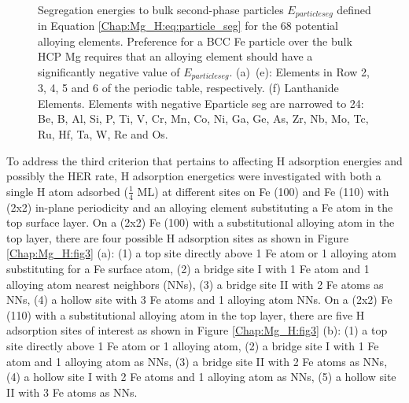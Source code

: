 \begin{figure}[!ht]
  \\
  \label{Chap:Mg_H:fig:5e}
  \label{Chap:Mg_H:fig:5f}
\caption[Segregation energies to bulk second-phase particles]{Segregation energies to bulk second-phase particles $E_{particle seg}$ defined in Equation \ref{Chap:Mg_H:eq:particle_seg} for the 68 potential alloying elements. Preference for a \ac{BCC} Fe particle over the bulk \ac{HCP} Mg requires that an alloying element should have a significantly negative value of $E_{particle seg}$. (a)~(e): Elements in Row 2, 3, 4, 5 and 6 of the periodic table, respectively. (f) Lanthanide Elements. Elements with negative Eparticle seg are narrowed to 24: Be, B, Al, Si, P, Ti, V, Cr, Mn, Co, Ni, Ga, Ge, As, Zr, Nb, Mo, Tc, Ru, Hf, Ta, W, Re and Os.}
  \label{Chap:Mg_H:fig5}
\end{figure}
\endgroup

To address the third criterion that pertains to affecting H adsorption energies and possibly the HER rate, H adsorption energetics were investigated with both a single H atom adsorbed ($\frac{1}{4}$ \ac{ML}) at different sites on Fe (100) and Fe (110) with (2x2) in-plane periodicity and an alloying element substituting a Fe atom in the top surface layer. On a (2x2) Fe (100) with a substitutional alloying atom in the top layer, there are four possible H adsorption sites as shown in Figure \ref{Chap:Mg_H:fig3} (a): (1) a top site directly above 1 Fe atom or 1 alloying atom substituting for a Fe surface atom, (2) a bridge site I with 1 Fe atom and 1 alloying atom nearest neighbors (NNs), (3) a bridge site II with 2 Fe atoms as NNs, (4) a hollow site with 3 Fe atoms and 1 alloying atom NNs. On a (2x2) Fe (110) with a substitutional alloying atom in the top layer, there are five H adsorption sites of interest as shown in Figure  \ref{Chap:Mg_H:fig3} (b): (1) a top site directly above 1 Fe atom or 1 alloying atom, (2) a bridge site I with 1 Fe atom and 1 alloying atom as NNs, (3) a bridge site II with 2 Fe atoms as NNs, (4) a hollow site I with 2 Fe atoms and 1 alloying atom as NNs, (5) a hollow site II with 3 Fe atoms as NNs.


